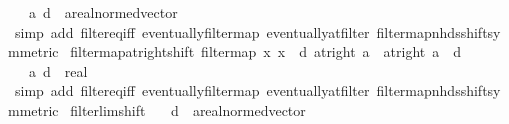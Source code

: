 \begin{isabellebody}
\ \ \ a\ d\ {\isacharcolon}{\kern0pt}{\isacharcolon}{\kern0pt}\ {\isachardoublequoteopen}{\isacharprime}{\kern0pt}a{\isacharcolon}{\kern0pt}{\isacharcolon}{\kern0pt}real{\isacharunderscore}{\kern0pt}normed{\isacharunderscore}{\kern0pt}vector{\isachardoublequoteclose}\isanewline
%
\isadelimproof
\ \ %
\endisadelimproof
%
\isatagproof
{}\isamarkupfalse%
\ {\isacharparenleft}{\kern0pt}simp\ add{\isacharcolon}{\kern0pt}\ filter{\isacharunderscore}{\kern0pt}eq{\isacharunderscore}{\kern0pt}iff\ eventually{\isacharunderscore}{\kern0pt}filtermap\ eventually{\isacharunderscore}{\kern0pt}at{\isacharunderscore}{\kern0pt}filter\ filtermap{\isacharunderscore}{\kern0pt}nhds{\isacharunderscore}{\kern0pt}shift{\isacharbrackleft}{\kern0pt}symmetric{\isacharbrackright}{\kern0pt}{\isacharparenright}{\kern0pt}%
\endisatagproof
{\isafoldproof}%
%
\isadelimproof
\isanewline
%
\endisadelimproof
\isanewline
{}\isamarkupfalse%
\ filtermap{\isacharunderscore}{\kern0pt}at{\isacharunderscore}{\kern0pt}right{\isacharunderscore}{\kern0pt}shift{\isacharcolon}{\kern0pt}\ {\isachardoublequoteopen}filtermap\ {\isacharparenleft}{\kern0pt}{\isasymlambda}x{\isachardot}{\kern0pt}\ x\ {\isacharminus}{\kern0pt}\ d{\isacharparenright}{\kern0pt}\ {\isacharparenleft}{\kern0pt}at{\isacharunderscore}{\kern0pt}right\ a{\isacharparenright}{\kern0pt}\ {\isacharequal}{\kern0pt}\ at{\isacharunderscore}{\kern0pt}right\ {\isacharparenleft}{\kern0pt}a\ {\isacharminus}{\kern0pt}\ d{\isacharparenright}{\kern0pt}{\isachardoublequoteclose}\isanewline
\ \ \ a\ d\ {\isacharcolon}{\kern0pt}{\isacharcolon}{\kern0pt}\ {\isachardoublequoteopen}real{\isachardoublequoteclose}\isanewline
%
\isadelimproof
\ \ %
\endisadelimproof
%
\isatagproof
{}\isamarkupfalse%
\ {\isacharparenleft}{\kern0pt}simp\ add{\isacharcolon}{\kern0pt}\ filter{\isacharunderscore}{\kern0pt}eq{\isacharunderscore}{\kern0pt}iff\ eventually{\isacharunderscore}{\kern0pt}filtermap\ eventually{\isacharunderscore}{\kern0pt}at{\isacharunderscore}{\kern0pt}filter\ filtermap{\isacharunderscore}{\kern0pt}nhds{\isacharunderscore}{\kern0pt}shift{\isacharbrackleft}{\kern0pt}symmetric{\isacharbrackright}{\kern0pt}{\isacharparenright}{\kern0pt}%
\endisatagproof
{\isafoldproof}%
%
\isadelimproof
\isanewline
%
\endisadelimproof
\isanewline
{}\isamarkupfalse%
\ filterlim{\isacharunderscore}{\kern0pt}shift{\isacharcolon}{\kern0pt}\isanewline
\ \ \ d\ {\isacharcolon}{\kern0pt}{\isacharcolon}{\kern0pt}\ {\isachardoublequoteopen}{\isacharprime}{\kern0pt}a{\isacharcolon}{\kern0pt}{\isacharcolon}{\kern0pt}real{\isacharunderscore}{\kern0pt}normed{\isacharunderscore}{\kern0pt}vector{\isachardoublequoteclose}\isanewline

\end{isabellebody}
